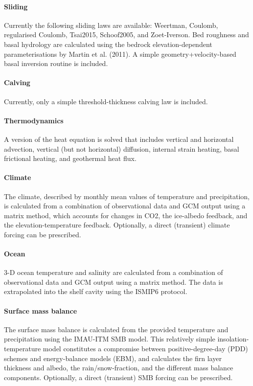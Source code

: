 \documentclass{article}
\begin{document}
\paragraph{Sliding}
Currently the following sliding laws are available: Weertman, Coulomb, regularised Coulomb, Tsai2015, Schoof2005, and Zoet-Iverson. Bed roughness and basal hydrology are calculated using the bedrock elevation-dependent parameterisations by Martin et al. (2011). A simple geometry+velocity-based basal inversion routine is included.

\paragraph{Calving}
Currently, only a simple threshold-thickness calving law is included.

\paragraph{Thermodynamics}
A version of the heat equation is solved that includes vertical and horizontal advection, vertical (but not horizontal) diffusion, internal strain heating, basal frictional heating, and geothermal heat flux.

\paragraph{Climate}
The climate, described by monthly mean values of temperature and precipitation, is calculated from a combination of observational  data and GCM output using a matrix method, which accounts for changes in CO2, the ice-albedo feedback, and the elevation-temperature feedback. Optionally, a direct (transient) climate forcing can be prescribed.

\paragraph{Ocean}
3-D ocean temperature and salinity are calculated from a combination of observational data and GCM output using a matrix method. The data is extrapolated into the shelf cavity using the ISMIP6 protocol.

\paragraph{Surface mass balance}
The surface mass balance is calculated from the provided temperature and precipitation using the IMAU-ITM SMB model. This relatively simple insolation-temperature model constitutes a compromise between positive-degree-day (PDD) schemes and energy-balance models (EBM), and calculates the firn layer thickness and albedo, the rain/snow-fraction, and the different mass balance components. Optionally, a direct (transient) SMB forcing can be prescribed.
\end{document}
